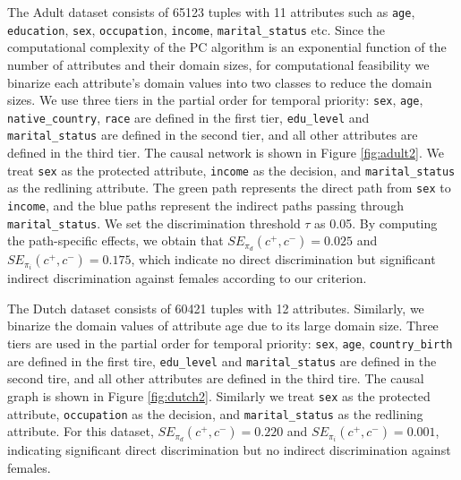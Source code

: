 \documentclass[letterpaper]{article}
\begin{document}
The Adult dataset consists of 65123 tuples with 11 attributes such as \texttt{age}, \texttt{education}, \texttt{sex}, \texttt{occupation}, \texttt{income}, \texttt{marital\_status} etc. Since the computational complexity of the PC algorithm is an exponential function of the number of attributes and their domain sizes, for computational feasibility we binarize each attribute's domain values into two classes to reduce the domain sizes. We use three tiers in the partial order for temporal priority: \texttt{sex}, \texttt{age}, \texttt{native\_country}, \texttt{race} are defined in the first tier, \texttt{edu\_level} and \texttt{marital\_status} are defined in the second tier, and all other attributes are defined in the third tier. The causal network is shown in Figure \ref{fig:adult2}. We treat \texttt{sex} as the protected attribute, \texttt{income} as the decision, and \texttt{marital\_status} as the redlining attribute. The green path represents the direct path from \texttt{sex} to \texttt{income}, and the blue paths represent the indirect paths passing through \texttt{marital\_status}. 
We set the discrimination threshold $\tau$ as 0.05. By computing the path-specific effects, we obtain that $SE_{\pi_{d}}(c^{+},c^{-}) = 0.025$ and $SE_{\pi_{i}}(c^{+},c^{-}) = 0.175$, which indicate no direct discrimination but significant indirect discrimination against females according to our criterion.

The Dutch dataset consists of 60421 tuples with 12 attributes. Similarly, we binarize the domain values of attribute age due to its large domain size. Three tiers are used in the partial order for temporal priority: \texttt{sex}, \texttt{age}, \texttt{country\_birth} are defined in the first tire, \texttt{edu\_level} and \texttt{marital\_status} are defined in the second tire, and all other attributes are defined in the third tire. The causal graph is shown in Figure \ref{fig:dutch2}. Similarly we treat \texttt{sex} as the protected attribute, \texttt{occupation} as the decision, and \texttt{marital\_status} as the redlining attribute. For this dataset, $SE_{\pi_{d}}(c^{+},c^{-}) = 0.220$ and $SE_{\pi_{i}}(c^{+},c^{-}) = 0.001$, indicating significant direct discrimination but no indirect discrimination against females.
\end{document}

